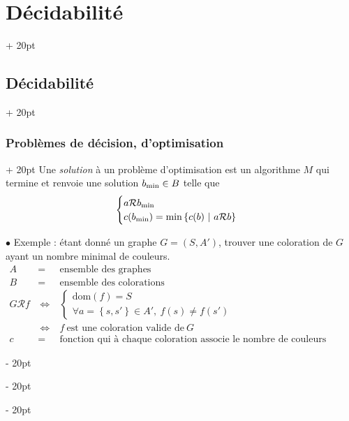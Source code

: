 \documentclass[a4paper, 12pt, twoside]{article}
\newcommand{\set}[1]{\left\{ #1 \right\}}
\newcommand{\ssi}{\ \Leftrightarrow \ }
\newcommand{\ind}[1][20pt]{\advance\leftskip + #1}
\newcommand{\deind}[1][20pt]{\advance\leftskip - #1}
\newenvironment{indt}[2][20pt]{#2 \par \ind[#1]}{\par \deind} %
\begin{document}
\begin{indt}{\section{Décidabilité}}
\begin{indt}{\subsection{Décidabilité}}
\begin{indt}{\subsubsection{Problèmes de décision, d'optimisation}}
                Une \emph{solution} à un problème d'optimisation est un algorithme $M$ qui termine et renvoie une solution $b_{\rm min} \in B$ telle que
                \[
                    \begin{cases}
                        a \mathcal R b_{\rm min}
                        \\
                        c(b_{\rm min}) = \min \set{c(b)\ |\ a \mathcal R b}
                    \end{cases}
                \]

                \vspace{12pt}
                
                $\bullet$ Exemple : étant donné un graphe $G = (S, A')$, trouver une coloration de $G$ ayant un nombre minimal de couleurs.
                \[
                    \begin{array}{rcl}
                        A
                        &=& \text{ensemble des graphes}
                        \\
                        B
                        &=& \text{ensemble des colorations}
                        \\
                        G \mathcal R f
                        &\ssi&
                        \begin{cases}
                            \mathrm{dom}(f) = S
                            \\
                            \forall a = \set{s, s'} \in A',\ f(s) \neq f(s')
                        \end{cases}
                        \\
                        &\ssi& f\ \text{est une coloration valide de}\ G
                        \\
                        c
                        &=& \text{fonction qui à chaque coloration associe le nombre de couleurs utilisées}
                    \end{array}
                \]

                \vspace{12pt}
                

\end{indt}
\end{indt}
\end{indt}
\end{document}
